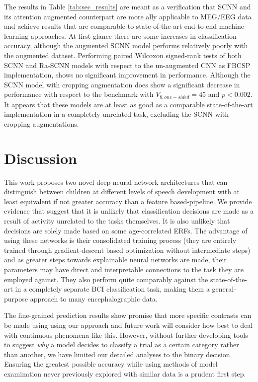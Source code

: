 \documentclass[fleqn,10pt]{wlscirep}
\begin{document}
The results in Table \ref{tab:sec_results} are meant as a verification that SCNN and its attention augmented counterpart are more ally applicable to MEG/EEG data and achieve results that are comparable to state-of-the-art end-to-end machine learning approaches. At first glance there are some increases in classification accuracy, although the augmented SCNN model performs relatively poorly with the augmented dataset. Performing paired Wilcoxon signed-rank tests of both SCNN and Ra-SCNN models with respect to the un-augmented CNN as FBCSP implementation, shows no significant improvement in performance. Although the SCNN model with cropping augmentation does show a significant decrease in performance with respect to the benchmark with $V_{8, one-sided}=45$ and $p<0.002$. It appears that these models are at least as good as a comparable state-of-the-art implementation in a completely unrelated task, excluding the SCNN with cropping augmentations.


\section*{Discussion}

This work proposes two novel deep neural network architectures that can distinguish between children at different levels of speech development with at least equivalent if not greater accuracy than a feature based-pipeline. We provide evidence that suggest that it is unlikely that classification decisions are made as a result of activity unrelated to the tasks themselves. It is also unlikely that decisions are solely made based on some age-correlated ERFs. The advantage of using these networks is their consolidated training process (they are entirely trained through gradient-descent based optimization without intermediate steps) and as greater steps towards explainable neural networks are made, their parameters may have direct and interpretable connections to the task they are employed against. They also perform quite comparably against the state-of-the-art in a completely separate BCI classification task, making them a general-purpose approach to many encephalographic data.

The fine-grained prediction results show promise that more specific contrasts can be made using using our approach and future work will consider how best to deal with continuous phenomena like this. However, without further developing tools to suggest {\em why} a model decides to classify a trial as a certain category rather than another, we have limited our detailed analyses to the binary decision. Ensuring the greatest possible accuracy while using methods of model examination never previously explored with similar data is a prudent first step.
\end{document}
